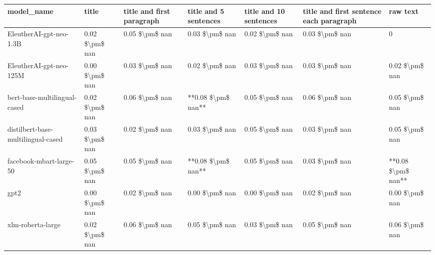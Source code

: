 \begin{tabular}{lllllll}
\toprule
                        model\_name &          title & title and first paragraph & title and 5 sentences & title and 10 sentences & title and first sentence each paragraph &           raw text \\
\midrule
           EleutherAI-gpt-neo-1.3B & 0.02 \$\textbackslash pm\$ nan &            0.05 \$\textbackslash pm\$ nan &        0.03 \$\textbackslash pm\$ nan &         0.02 \$\textbackslash pm\$ nan &                          0.03 \$\textbackslash pm\$ nan &                  0 \\
           EleutherAI-gpt-neo-125M & 0.00 \$\textbackslash pm\$ nan &            0.03 \$\textbackslash pm\$ nan &        0.02 \$\textbackslash pm\$ nan &         0.03 \$\textbackslash pm\$ nan &                          0.03 \$\textbackslash pm\$ nan &     0.02 \$\textbackslash pm\$ nan \\
      bert-base-multilingual-cased & 0.02 \$\textbackslash pm\$ nan &            0.06 \$\textbackslash pm\$ nan &    **0.08 \$\textbackslash pm\$ nan** &         0.05 \$\textbackslash pm\$ nan &                          0.06 \$\textbackslash pm\$ nan &     0.05 \$\textbackslash pm\$ nan \\
distilbert-base-multilingual-cased & 0.03 \$\textbackslash pm\$ nan &            0.02 \$\textbackslash pm\$ nan &        0.03 \$\textbackslash pm\$ nan &         0.05 \$\textbackslash pm\$ nan &                          0.03 \$\textbackslash pm\$ nan &     0.05 \$\textbackslash pm\$ nan \\
           facebook-mbart-large-50 & 0.05 \$\textbackslash pm\$ nan &            0.05 \$\textbackslash pm\$ nan &    **0.08 \$\textbackslash pm\$ nan** &         0.05 \$\textbackslash pm\$ nan &                          0.03 \$\textbackslash pm\$ nan & **0.08 \$\textbackslash pm\$ nan** \\
                              gpt2 & 0.00 \$\textbackslash pm\$ nan &            0.02 \$\textbackslash pm\$ nan &        0.00 \$\textbackslash pm\$ nan &         0.00 \$\textbackslash pm\$ nan &                          0.02 \$\textbackslash pm\$ nan &     0.00 \$\textbackslash pm\$ nan \\
                 xlm-roberta-large & 0.02 \$\textbackslash pm\$ nan &            0.06 \$\textbackslash pm\$ nan &        0.05 \$\textbackslash pm\$ nan &         0.03 \$\textbackslash pm\$ nan &                          0.05 \$\textbackslash pm\$ nan &     0.06 \$\textbackslash pm\$ nan \\
\bottomrule
\end{tabular}

